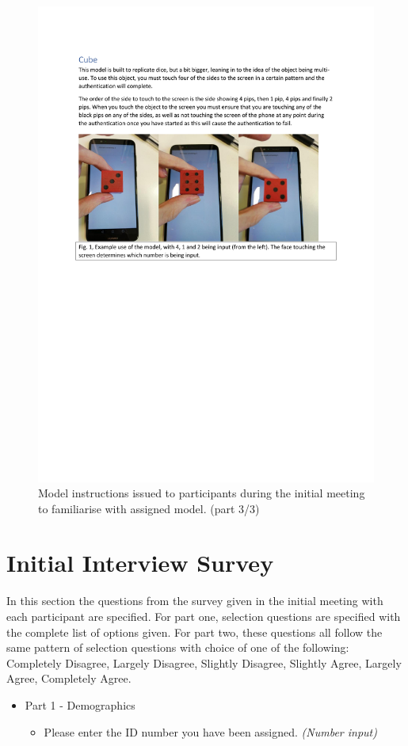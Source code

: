 \documentclass{l4proj}
\begin{document}
\begin{appendices}
\begin{figure}
    \centering
    \includegraphics[page=3,width=\linewidth]{Appendices/Model Instructions.pdf}
    \caption{Model instructions issued to participants during the initial meeting to familiarise with assigned model. (part 3/3)}
    \label{fig:interaction3}
\end{figure}

\newpage

\chapter{Initial Interview Survey}

In this section the questions from the survey given in the initial meeting with each participant are specified. For part one, selection questions are specified with the complete list of options given. For part two, these questions all follow the same pattern of selection questions with choice of one of the following: Completely Disagree, Largely Disagree, Slightly Disagree, Slightly Agree, Largely Agree, Completely Agree.
\begin{itemize}
    \item Part 1 - Demographics
    \begin{itemize}
        \item Please enter the ID number you have been assigned. \textit{(Number input)}


\end{itemize}
\end{itemize}
\end{appendices}
\end{document}
